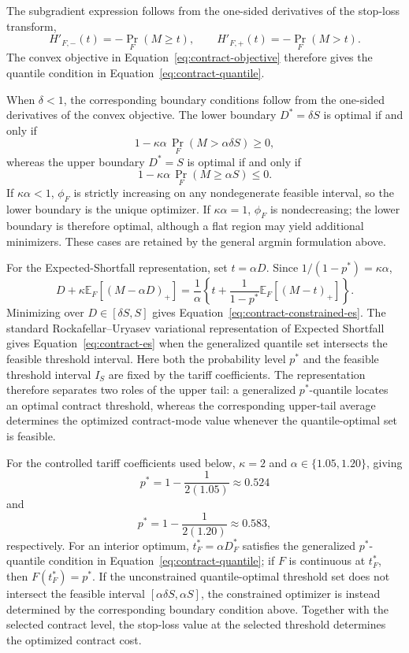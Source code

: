 \documentclass[Times1COL]{WileyNJDv5}
\begin{document}
\noindent
The subgradient expression follows from the one-sided derivatives of the stop-loss transform,
\[
H'_{F,-}(t)=-\Pr_F(M\geq t),
\qquad
H'_{F,+}(t)=-\Pr_F(M>t).
\]
The convex objective in Equation~\eqref{eq:contract-objective} therefore gives the quantile condition in Equation~\eqref{eq:contract-quantile}.

When $\delta<1$, the corresponding boundary conditions follow from the one-sided derivatives of the convex objective. The lower boundary $D^\ast=\delta S$ is optimal if and only if
\[
1-\kappa\alpha\,
\Pr_F(M>\alpha\delta S)
\geq0,
\]
whereas the upper boundary $D^\ast=S$ is optimal if and only if
\[
1-\kappa\alpha\,
\Pr_F(M\geq\alpha S)
\leq0.
\]
If $\kappa\alpha<1$, $\phi_F$ is strictly increasing on any nondegenerate feasible interval, so the lower boundary is the unique optimizer. If $\kappa\alpha=1$, $\phi_F$ is nondecreasing; the lower boundary is therefore optimal, although a flat region may yield additional minimizers. These cases are retained by the general argmin formulation above.

For the Expected-Shortfall representation, set $t=\alpha D$. Since
$1/(1-p^\ast)=\kappa\alpha$,
\[
D+\kappa\mathbb{E}_F[(M-\alpha D)_+]
=
\frac{1}{\alpha}
\left\{
t+\frac{1}{1-p^\ast}\mathbb{E}_F[(M-t)_+]
\right\}.
\]
Minimizing over $D\in[\delta S,S]$ gives
Equation~\eqref{eq:contract-constrained-es}. The standard
Rockafellar--Uryasev variational representation of Expected Shortfall
\cite{RockafellarUryasev2002} gives Equation~\eqref{eq:contract-es}
when the generalized quantile set intersects the feasible threshold
interval. Here both the probability level $p^\ast$ and the feasible threshold
interval $I_S$ are fixed by the tariff coefficients. The representation
therefore separates two roles of the upper tail: a generalized
$p^\ast$-quantile locates an optimal contract threshold, whereas the
corresponding upper-tail average determines the optimized contract-mode
value whenever the quantile-optimal set is feasible.

For the controlled tariff coefficients used below, $\kappa=2$ and
$\alpha\in\{1.05,1.20\}$, giving
\[
p^\ast
=
1-\frac{1}{2(1.05)}
\approx0.524
\]
and
\[
p^\ast
=
1-\frac{1}{2(1.20)}
\approx0.583,
\]
respectively. For an interior optimum,
$t_F^\ast=\alpha D_F^\ast$ satisfies the generalized
$p^\ast$-quantile condition in Equation~\eqref{eq:contract-quantile};
if $F$ is continuous at $t_F^\ast$, then
$F(t_F^\ast)=p^\ast$. If the unconstrained quantile-optimal threshold
set does not intersect the feasible interval
$[\alpha\delta S,\alpha S]$, the constrained optimizer is instead
determined by the corresponding boundary condition above. Together
with the selected contract level, the stop-loss value at the selected
threshold determines the optimized contract cost.
\end{document}
